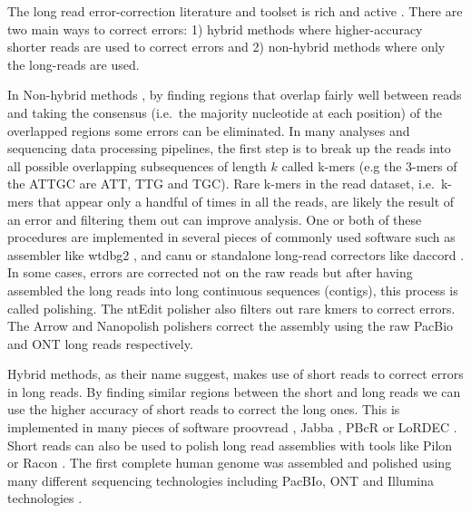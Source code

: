\documentclass[
  11pt,
  twoside,
  BCOR=10mm,
  listof=totoc]{scrbook}
\begin{document}
The long read error-correction literature and toolset is rich and active \autocite{limaComparativeAssessmentLongread2020,fuComparativeEvaluationHybrid2019,zhangComprehensiveEvaluationLong2020}. There are two main ways to correct errors: 1) hybrid methods where higher-accuracy shorter reads are used to correct errors and 2) non-hybrid methods where only the long-reads are used.

In Non-hybrid methods \autocite{limaComparativeAssessmentLongread2020,amarasingheOpportunitiesChallengesLongread2020}, by finding regions that overlap fairly well between reads and taking the consensus (i.e.~the majority nucleotide at each position) of the overlapped regions some errors can be eliminated. In many analyses and sequencing data processing pipelines, the first step is to break up the reads into all possible overlapping subsequences of length \(k\) called k-mers (e.g the 3-mers of the ATTGC are ATT, TTG and TGC). Rare k-mers in the read dataset, i.e.~k-mers that appear only a handful of times in all the reads, are likely the result of an error and filtering them out can improve analysis. One or both of these procedures are implemented in several pieces of commonly used software such as assembler like wtdbg2 \autocite{ruanFastAccurateLongread2020}, and canu \autocite{korenCanuScalableAccurate2017} or standalone long-read correctors like daccord \autocite{tischlerNonHybridLong2017}. In some cases, errors are corrected not on the raw reads but after having assembled the long reads into long continuous sequences (contigs), this process is called polishing. The ntEdit polisher \autocite{warrenNtEditScalableGenome2019} also filters out rare kmers to correct errors. The Arrow \autocite{heplerImprovedCircularConsensus2016} and Nanopolish \autocite{simpsonDetectingDNACytosine2017} polishers correct the assembly using the raw PacBio and ONT long reads respectively.

Hybrid methods, as their name suggest, makes use of short reads to correct errors in long reads. By finding similar regions between the short and long reads we can use the higher accuracy of short reads to correct the long ones. This is implemented in many pieces of software proovread \autocite{hacklProovreadLargescaleHighaccuracy2014}, Jabba \autocite{miclotteJabbaHybridError2016}, PBcR \autocite{korenHybridErrorCorrection2012} or LoRDEC \autocite{salmelaLoRDECAccurateEfficient2014}. Short reads can also be used to polish long read assemblies with tools like Pilon \autocite{walkerPilonIntegratedTool2014} or Racon \autocite{vaserFastAccurateNovo2017}. The first complete human genome was assembled and polished using many different sequencing technologies including PacBIo, ONT and Illumina technologies \autocite{nurk2022}.
\end{document}

